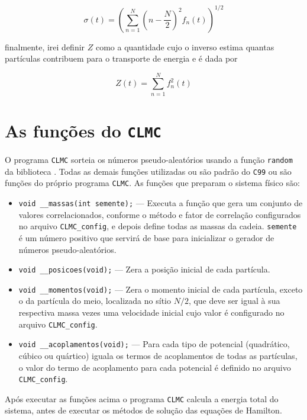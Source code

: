 \documentclass[
   article,                      %
   10pt,                         %
   openright,                    %
   oneside,                      %
   a4paper,                      %
   sumario = tradicional,        %
	chapter=TITLE,		%
	section=TITLE,		%
	subsection=TITLE,	%
	subsubsection=TITLE,%
   english,                      %
   french,                       %
   spanish,                      %
   brazil,                       %
   xcolor=table                  %
]{abntex2}
\begin{document}
\begin{equation}
\sigma(t) = \left(\sum_{n=1}^N \left(n - \frac{N}{2}\right)^2 f_n(t) \right)^{1/2}
\end{equation}

\noindent
finalmente, irei definir $Z$ como a quantidade cujo o inverso
estima quantas partículas
contribuem para o transporte de energia e é dada por

\begin{equation}
Z(t) = \sum_{n=1}^N f_n^2(t)
\end{equation}

\section{As funções do \texttt{CLMC}}

O programa \texttt{CLMC} sorteia os números pseudo-aleatórios usando a função
\texttt{random}
da biblioteca \texttt{}. Todas as demais funções utilizadas
ou são padrão do \texttt{C99} ou são funções do próprio programa \texttt{CLMC}.
As funções que preparam o sistema físico são:

\begin{itemize}[nosep]

\item \texttt{void \_\_massas(int semente);} ---
Executa a função que gera um conjunto de valores correlacionados,
conforme o método e fator de correlação configurados no arquivo
\texttt{CLMC\_config}, e depois define todas as massas da cadeia.
\texttt{semente} é um número positivo que servirá de base para inicializar o
gerador de números pseudo-aleatórios.

\item \texttt{void \_\_posicoes(void);} --- Zera a posição inicial de
cada partícula.

\item \texttt{void \_\_momentos(void);} --- Zera o momento inicial de
cada partícula, exceto o da partícula do meio, localizada no sítio $N/2$,
que deve ser igual à sua respectiva massa vezes uma velocidade inicial
cujo valor é configurado no arquivo \texttt{CLMC\_config}.

\item \texttt{void \_\_acoplamentos(void);} --- Para cada tipo de potencial
(quadrático, cúbico ou quártico)
iguala os termos de acoplamentos
de todas as partículas, o valor do termo de acoplamento para cada potencial
é definido no arquivo \texttt{CLMC\_config}.
\end{itemize}

Após executar as funções acima o programa \texttt{CLMC} calcula a energia
total do sistema, antes de executar os métodos de solução das equações de Hamilton.


   \postextual
   
\end{document}
